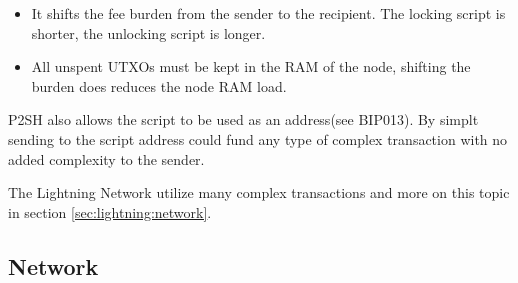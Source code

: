 \begin{itemize}

	\item It shifts the fee burden from the sender to the recipient. The locking script is shorter, the unlocking script is longer.
	
	\item All unspent UTXOs must be kept in the RAM of the node, shifting the burden does reduces the node RAM load. 
	
\end{itemize}

P2SH also allows the script to be used as an address(see BIP013\cite{bip:0013:p2shaddr}). By simplt sending to the script address could fund any type of complex transaction with no added complexity to the sender.

The Lightning Network utilize many complex transactions and more on this topic in section \ref{sec:lightning:network}.

\subsection{Network}

